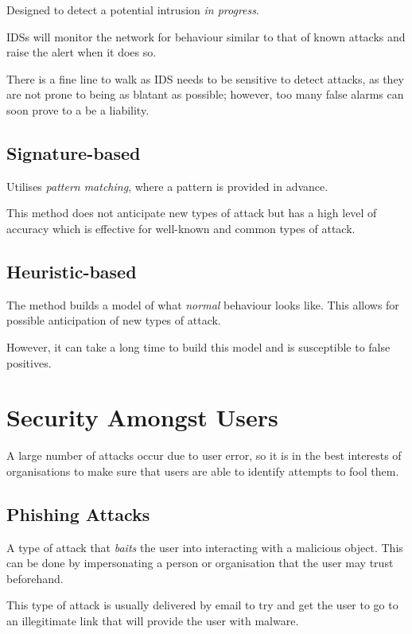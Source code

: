 \documentclass{article}
\begin{document}
Designed to detect a potential intrusion \textit{in progress}.

IDSs will monitor the network for behaviour similar to that of known attacks and raise the alert when it does so.

There is a fine line to walk as IDS needs to be sensitive to detect attacks, as they are not prone to being as blatant as possible; however, too many false alarms can soon prove to a be a liability.

\subsection{Signature-based}

Utilises \textit{pattern matching}, where a pattern is provided in advance.

This method does not anticipate new types of attack but has a high level of accuracy which is effective for well-known and common types of attack.

\subsection{Heuristic-based}

The method builds a model of what \textit{normal} behaviour looks like. This allows for possible anticipation of new types of attack.

However, it can take a long time to build this model and is susceptible to false positives.

\section{Security Amongst Users}

A large number of attacks occur due to user error, so it is in the best interests of organisations to make sure that users are able to identify attempts to fool them.

\subsection{Phishing Attacks}

A type of attack that \textit{baits} the user into interacting with a malicious object. This can be done by impersonating a person or organisation that the user may trust beforehand.

This type of attack is usually delivered by email to try and get the user to go to an illegitimate link that will provide the user with malware.
\end{document}
